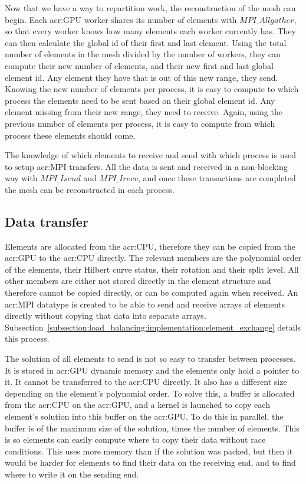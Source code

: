 Now that we have a way to repartition work, the reconstruction of the mesh can begin. Each
\acrshort{acr:GPU} worker shares its number of elements with \(MPI\_Allgather\), so that every worker
knows how many elements each worker currently has. They can then calculate the global id of their
first and last element. Using the total number of elements in the mesh divided by the number of
workers, they can compute their new number of elements, and their new first and last global element
id. Any element they have that is out of this new range, they send. Knowing the new number of
elements per process, it is easy to compute to which process the elements need to be sent based on
their global element id. Any element missing from their new range, they need to receive. Again,
using the previous number of elements per process, it is easy to compute from which process these
elements should come. 

The knowledge of which elements to receive and send with which process is used to setup
\acrshort{acr:MPI} transfers. All the data is sent and received in a non-blocking way with
\(MPI\_Isend\) and \(MPI\_Irecv\), and once these transactions are completed the mesh can be
reconstructed in each process.

\subsection{Data transfer}\label{subsection:load_balancing:reconstruction:data_transfer}

Elements are allocated from the \acrshort{acr:CPU}, therefore they can be copied from the
\acrshort{acr:GPU} to the \acrshort{acr:CPU} directly. The relevant members are the polynomial order
of the elements, their Hilbert curve status, their rotation and their split level. All other members
are either not stored directly in the element structure and therefore cannot be copied directly, or
can be computed again when received. An \acrshort{acr:MPI} datatype is created to be able to send
and receive arrays of elements directly without copying that data into separate arrays.
Subsection~\ref{subsection:load_balancing:implementation:element_exchange} details this process.

The solution of all elements to send is not so easy to transfer between processes. It is stored in
\acrshort{acr:GPU} dynamic memory and the elements only hold a pointer to it. It cannot be
transferred to the \acrshort{acr:CPU} directly. It also has a different size depending on the
element's polynomial order. To solve this, a buffer is allocated from the \acrshort{acr:CPU} on the
\acrshort{acr:GPU}, and a kernel is launched to copy each element's solution into this buffer on the
\acrshort{acr:GPU}. To do this in parallel, the buffer is of the maximum size of the solution, times
the number of elements. This is so elements can easily compute where to copy their data without race
conditions. This uses more memory than if the solution was packed, but then it would be harder for
elements to find their data on the receiving end, and to find where to write it on the sending end. 

